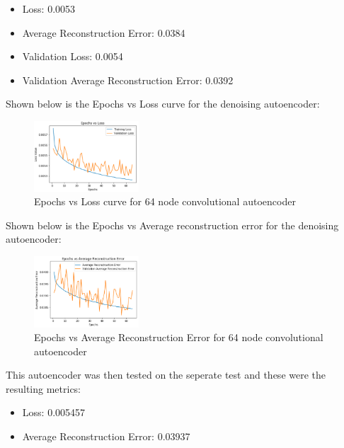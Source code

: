 \documentclass[conference]{IEEEtran}
\begin{document}
    \begin{itemize}
        \item Loss: 0.0053
        \item Average Reconstruction Error: 0.0384
        \item Validation Loss: 0.0054
        \item Validation Average Reconstruction Error: 0.0392
    \end{itemize}

    Shown below is the Epochs vs Loss curve for the denoising autoencoder:

    \begin{figure}[H]
        \centering
        \captionsetup{justification=centering}
        \centering
            \includegraphics[width=0.35\textwidth]{37.png}
            \caption{Epochs vs Loss curve for 64 node convolutional autoencoder}
    \end{figure}

    Shown below is the Epochs vs Average reconstruction error for the denoising autoencoder:

    \begin{figure}[H]
        \centering
        \captionsetup{justification=centering}
        \centering
            \includegraphics[width=0.35\textwidth]{38.png}
            \caption{Epochs vs Average Reconstruction Error for 64 node convolutional autoencoder}
    \end{figure}

    This autoencoder was then tested on the seperate test and these were the resulting metrics:

    \begin{itemize}
        \item Loss: 0.005457
        \item Average Reconstruction Error: 0.03937\\
    \end{itemize}
\end{document}
